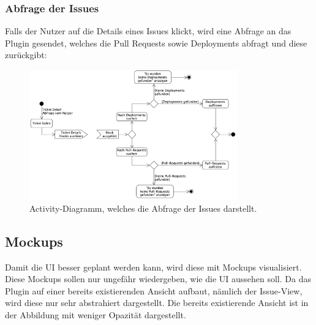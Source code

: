 \subsubsection{Abfrage der Issues}
Falls der Nutzer auf die Details eines Issues klickt, wird eine Abfrage an das Plugin gesendet, welches die Pull Requests sowie
Deployments abfragt und diese zurückgibt:
\begin{figure}[H]
  \centering
  \includegraphics[width=0.8\textwidth]{images/activity/issues-view.png}
  \caption[Activity-Diagramm, welches die Abfrage der Issues darstellt.]{Activity-Diagramm, welches die Abfrage der Issues darstellt.}
  \label{fig:activity_issues}
\end{figure}

\subsection{Mockups}
\label{sec:mockups}
Damit die UI besser geplant werden kann, wird diese mit Mockups visualisiert. Diese Mockups sollen
nur ungefähr wiedergeben, wie die UI aussehen soll. Da das Plugin auf einer bereits existierenden 
Ansicht aufbaut, nämlich der Issue-View, wird diese nur sehr abstrahiert dargestellt. \newline
Die bereits existierende Ansicht ist in der Abbildung mit weniger Opazität dargestellt.

